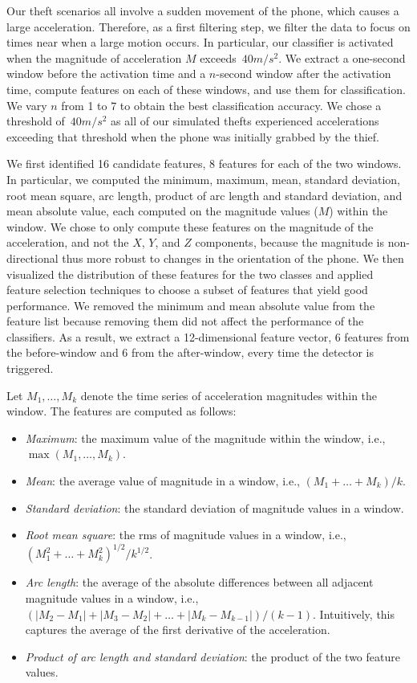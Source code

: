 Our theft scenarios all involve a sudden movement of the phone, which causes a large acceleration.
Therefore, as a first filtering step, we filter the data to focus on times near when a large motion occurs.
In particular, our classifier is activated when the magnitude of acceleration $M$ exceeds~$40 m/s^2$.
We extract a one-second window before the activation time and a $n$-second window after the activation time, compute features on each of these windows, and use them for classification.
We vary $n$ from 1 to 7 to obtain the best classification accuracy.
We chose a threshold of~$40 m/s^2$ as all of our simulated thefts experienced accelerations exceeding that threshold when the phone was initially grabbed by the thief.

We first identified 16 candidate features, 8 features for each of the two windows.
In particular, we computed the minimum, maximum, mean, standard deviation, root mean square, arc length, product of arc length and standard deviation, and mean absolute value, each computed on the magnitude values ($M$) within the window.
We chose to only compute these features on the magnitude of the acceleration, and not the $X$, $Y$, and $Z$ components, because the magnitude is non-directional thus more robust to changes in the orientation of the phone. 
We then visualized the distribution of these features for the two classes and applied feature selection techniques to choose a subset of features that yield good performance.
We removed the minimum and mean absolute value from the feature list because removing them did not affect the performance of the classifiers. 
As a result, we extract a 12-dimensional feature vector, 6 features from the before-window and 6 from the after-window, every time the detector is triggered.

Let $M_1,\dots,M_k$ denote the time series of acceleration magnitudes within the window.
The features are computed as follows:
\begin{itemize}
\item \emph{Maximum}: the maximum value of the magnitude within the window, i.e., $\max(M_1,\dots,M_k)$.
\item \emph{Mean}: the average value of magnitude in a window, i.e., $(M_1+\dots + M_k)/k$.
\item \emph{Standard deviation}: the standard deviation of magnitude values in a window.
\item \emph{Root mean square}: the rms of magnitude values in a window, i.e., $(M_1^2 + \dots + M_k^2)^{1/2}/k^{1/2}$.
\item \emph{Arc length}: the average of the absolute differences between all adjacent magnitude values in a window, i.e., $(|M_2-M_1| + |M_3-M_2| + \dots + |M_k-M_{k-1}|)/(k-1)$.
Intuitively, this captures the average of the first derivative of the acceleration.
\item \emph{Product of arc length and standard deviation}: the product of the two feature values.
\end{itemize}

